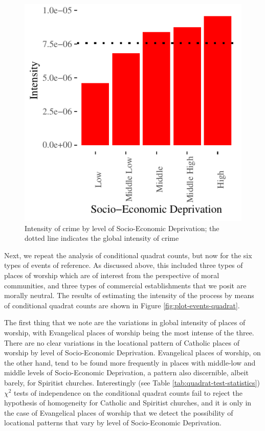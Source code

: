 \documentclass[smallextended]{svjour3}       %
\begin{document}
\begin{figure}
\centering
\includegraphics{Moral_Communities_and_Crime_v1_files/figure-latex/plot-crime-quadrat-1.pdf}
\caption{\label{fig:plot-crime-quadrat}Intensity of crime by level of
Socio-Economic Deprivation; the dotted line indicates the global
intensity of crime}
\end{figure}

Next, we repeat the analysis of conditional quadrat counts, but now for
the six types of events of reference. As discussed above, this included
three types of places of worship which are of interest from the
perspective of moral communities, and three types of commercial
establishments that we posit are morally neutral. The results of
estimating the intensity of the process by means of conditional quadrat
counts are shown in Figure \ref{fig:plot-events-quadrat}.

The first thing that we note are the variations in global intensity of
places of worship, with Evangelical places of worship being the most
intense of the three. There are no clear variations in the locational
pattern of Catholic places of worship by level of Socio-Economic
Deprivation. Evangelical places of worship, on the other hand, tend to
be found more frequently in places with middle-low and middle levels of
Socio-Economic Deprivation, a pattern also discernible, albeit barely,
for Spiritist churches. Interestingly (see Table
\ref{tab:quadrat-test-statistics}) \(\chi^2\) tests of independence on
the conditional quadrat counts fail to reject the hypothesis of
homogeneity for Catholic and Spiritist churches, and it is only in the
case of Evangelical places of worship that we detect the possibility of
locational patterns that vary by level of Socio-Economic Deprivation.
\end{document}
